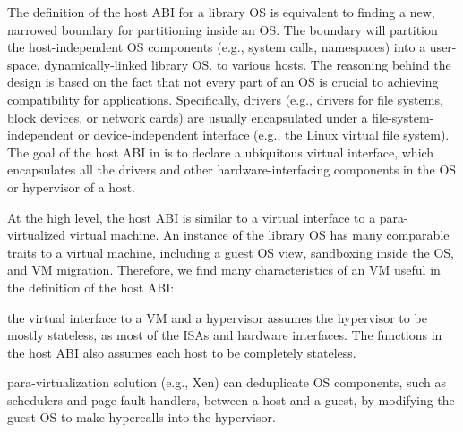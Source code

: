 The definition of the host ABI for a library OS
is equivalent to finding a new, narrowed boundary for partitioning inside an OS.
The boundary will partition
the host-independent OS components (e.g., system calls, namespaces) into 
a user-space, dynamically-linked library OS.
to various hosts.
The reasoning behind the \graphene{} design is based on the fact that not every part of an OS is crucial to achieving compatibility for applications.
Specifically, drivers (e.g., drivers for file systems, block devices, or network cards) are usually encapsulated under a file-system-independent or device-independent interface (e.g., the Linux virtual file system).
The goal of the host ABI in \graphene{} is to declare a ubiquitous virtual interface,
which encapsulates all the drivers and other hardware-interfacing components in the OS or hypervisor of a host.






At the high level,  the host ABI is similar to a virtual interface to a para-virtualized virtual machine.
An instance of the \graphene{} library OS has many comparable traits to a virtual machine,
including a guest OS view, sandboxing inside the OS, and VM migration.
Therefore, we find many characteristics of an VM useful in the definition of the host ABI:

\begin{compactitem}

\item the virtual interface to a VM and a hypervisor assumes the hypervisor to be mostly stateless,
as most of the ISAs and hardware interfaces.
The functions in the host ABI also assumes each host to be completely stateless.

\item para-virtualization solution (e.g., Xen) can deduplicate OS components, such as  schedulers and page fault handlers, between a host and a guest,
by modifying the guest OS to make hypercalls into the hypervisor.

\end{compactitem}




